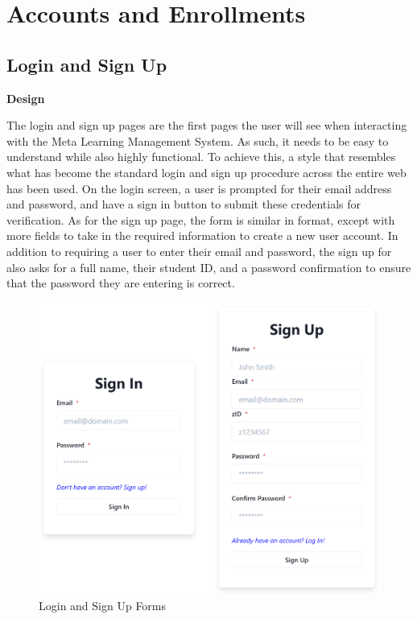 \section{Accounts and Enrollments}

\subsection{Login and Sign Up}
\textbf{Design}

The login and sign up pages are the first pages the user will see when interacting with the Meta Learning Management System. As such, it needs to be easy to understand while also highly functional. To achieve this, a style that resembles what has become the standard login and sign up procedure across the entire web has been used. On the login screen, a user is prompted for their email address and password, and have a sign in button to submit these credentials for verification. As for the sign up page, the form is similar in format, except with more fields to take in the required information to create a new user account. In addition to requiring a user to enter their email and password, the sign up for also asks for a full name, their student ID, and a password confirmation to ensure that the password they are entering is correct.

\begin{figure}[h!]
    \centering
    \includegraphics[scale=0.25]{images/accounts-login.png}
    \caption{Login and Sign Up Forms}
\end{figure}

